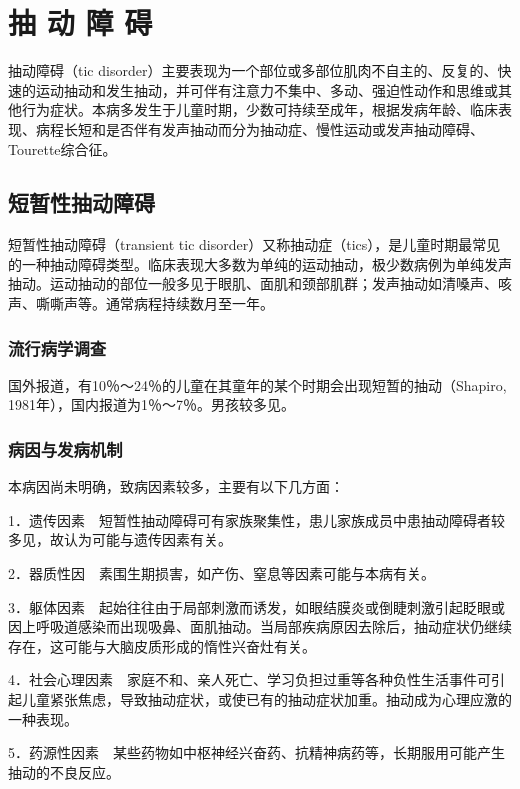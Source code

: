 \section{抽 动 障 碍}

抽动障碍（tic
disorder）主要表现为一个部位或多部位肌肉不自主的、反复的、快速的运动抽动和发生抽动，并可伴有注意力不集中、多动、强迫性动作和思维或其他行为症状。本病多发生于儿童时期，少数可持续至成年，根据发病年龄、临床表现、病程长短和是否伴有发声抽动而分为抽动症、慢性运动或发声抽动障碍、Tourette综合征。

\subsection{短暂性抽动障碍}

短暂性抽动障碍（transient tic
disorder）又称抽动症（tics），是儿童时期最常见的一种抽动障碍类型。临床表现大多数为单纯的运动抽动，极少数病例为单纯发声抽动。运动抽动的部位一般多见于眼肌、面肌和颈部肌群；发声抽动如清嗓声、咳声、嘶嘶声等。通常病程持续数月至一年。

\subsubsection{流行病学调查}

国外报道，有10％～24％的儿童在其童年的某个时期会出现短暂的抽动（Shapiro,
1981年），国内报道为1％～7％。男孩较多见。

\subsubsection{病因与发病机制}

本病因尚未明确，致病因素较多，主要有以下几方面：

1．遗传因素　短暂性抽动障碍可有家族聚集性，患儿家族成员中患抽动障碍者较多见，故认为可能与遗传因素有关。

2．器质性因　素围生期损害，如产伤、窒息等因素可能与本病有关。

3．躯体因素　起始往往由于局部刺激而诱发，如眼结膜炎或倒睫刺激引起眨眼或因上呼吸道感染而出现吸鼻、面肌抽动。当局部疾病原因去除后，抽动症状仍继续存在，这可能与大脑皮质形成的惰性兴奋灶有关。

4．社会心理因素　家庭不和、亲人死亡、学习负担过重等各种负性生活事件可引起儿童紧张焦虑，导致抽动症状，或使已有的抽动症状加重。抽动成为心理应激的一种表现。

5．药源性因素　某些药物如中枢神经兴奋药、抗精神病药等，长期服用可能产生抽动的不良反应。

